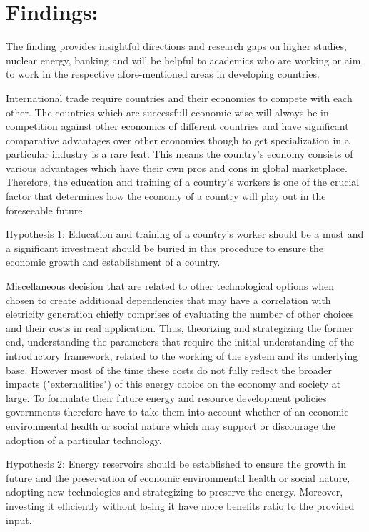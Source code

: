 \documentclass[]{article}
\begin{document}
\section{Findings:}

 The finding provides insightful directions and research gaps on higher studies, nuclear energy, banking and will be helpful to academics who are working or aim to work in the respective afore-mentioned areas in developing countries.
 
 
 
 International trade require countries and their economies to compete with each other. 
 The countries which are successfull economic-wise will always be in competition against other economics of different countries and have significant comparative advantages over other economies though to get specialization in a particular industry is a rare feat. This means the country's economy consists of various advantages which have their own pros and cons in global marketplace. Therefore, the education and training of a country's workers is one of the crucial factor that determines how the economy of a country will play out in the foreseeable future.
 
 Hypothesis 1: Education and training of a country's worker should be a must and a significant investment should be buried in this procedure to ensure the economic growth and establishment of a country.
 
 Miscellaneous decision that are related to other technological options when chosen to create additional dependencies that may have a correlation with eletricity generation chiefly comprises of evaluating the number of other choices and their costs in real application. Thus, theorizing and strategizing the former end, understanding the parameters that require the initial understanding of the introductory framework, related to the working of the system and its underlying base.
 However most of the time these costs do not fully reflect the broader impacts ("externalities") of this energy choice on the economy and society at large. To formulate their future energy and resource development policies governments therefore have to take them into account whether of an economic environmental health or social nature which may support or discourage the adoption of a particular technology.
 
 Hypothesis 2: Energy reservoirs should be established to ensure the growth in future and the preservation of economic environmental health or social nature, adopting new technologies and strategizing to preserve the energy. Moreover, investing it efficiently without losing it have more benefits ratio to the provided input.
 
\end{document}
